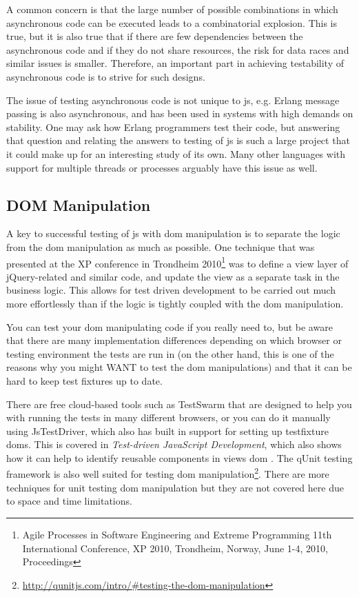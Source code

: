 \documentclass[11pt]{article}
\begin{document}
A common concern is that the large number of possible combinations in which asynchronous code can be executed leads to a combinatorial explosion. This is true, but it is also true that if there are few dependencies between the asynchronous code and if they do not share resources, the risk for data races and similar issues is smaller. Therefore, an important part in achieving testability of asynchronous code is to strive for such designs.

The issue of testing asynchronous code is not unique to \gls{js}, e.g. Erlang message passing is also asynchronous, and has been used in systems with high demands on stability. One may ask how Erlang programmers test their code, but answering that question and relating the answers to testing of \gls{js} is such a large project that it could make up for an interesting study of its own. Many other languages with support for multiple threads or processes arguably have this issue as well.


\subsection{DOM Manipulation}

A key to successful testing of \gls{js} with \gls{dom} manipulation is to separate the logic from the \gls{dom} manipulation as much as possible. One technique that was presented at the XP conference in Trondheim 2010\footnote{Agile Processes in Software Engineering and Extreme Programming 11th International Conference, XP 2010, Trondheim, Norway, June 1-4, 2010, Proceedings} was to define a view layer of jQuery-related and similar code, and update the view as a separate task in the business logic. This allows for test driven development to be carried out much more effortlessly than if the logic is tightly coupled with the \gls{dom} manipulation. \cite[question~4]{Ahnve} %

You can test your \gls{dom} manipulating code if you really need to, but be aware that there are many implementation differences depending on which browser or testing environment the tests are run in (on the other hand, this is one of the reasons why you might WANT to test the \gls{dom} manipulations) and that it can be hard to keep test fixtures up to date.

There are free cloud-based tools such as TestSwarm that are designed to help you with running the tests in many different browsers, or you can do it manually using JsTestDriver, which also has built in support for setting up \gls{testfixture} \glspl{dom}. This is covered in \emph{Test-driven JavaScript Development}, which also shows how it can help to identify reusable components in views \gls{dom} \cite[p.~389-435]{Tddjs}. The qUnit testing framework is also well suited for testing \gls{dom} manipulation\footnote{\url{http://qunitjs.com/intro/\#testing-the-dom-manipulation}}. There are more techniques for unit testing \gls{dom} manipulation but they are not covered here due to space and time limitations.
\end{document}
